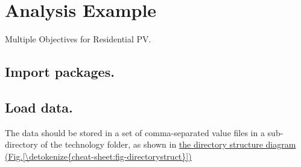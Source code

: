 \documentclass[letterpaper,10pt,english]{sphinxmanual}
\begin{document}
\begin{sphinxVerbatim}[commandchars=\\\{\}]
   \PYG{p}{[}  \PYG{p}{]}
\end{sphinxVerbatim}


\chapter{Analysis Example}
\label{\detokenize{example-analysis:analysis-example}}\label{\detokenize{example-analysis:sec-analysisexample}}\label{\detokenize{example-analysis::doc}}
Multiple Objectives for Residential PV.


\section{Import packages.}
\label{\detokenize{example-analysis:import-packages}}
\begin{sphinxVerbatim}[commandchars=\\\{\}]
 
 
 
\end{sphinxVerbatim}

\begin{sphinxVerbatim}[commandchars=\\\{\}]
               
   
              
             
               

              
   
\end{sphinxVerbatim}


\section{Load data.}
\label{\detokenize{example-analysis:load-data}}
The data should be stored in a set of comma-separated value files in a sub-directory of the technology folder, as shown in \hyperref[\detokenize{cheat-sheet:fig-directorystruct}]{the directory structure diagram (Fig.\@ \ref{\detokenize{cheat-sheet:fig-directorystruct}})}
\end{document}
